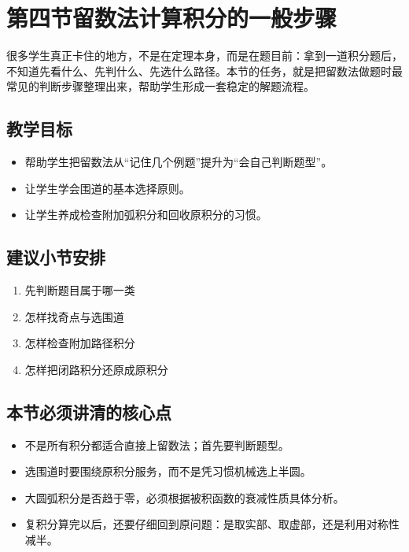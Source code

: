 \section{第四节\quad 留数法计算积分的一般步骤}

\begin{wulibj}[本节要解决的问题]
很多学生真正卡住的地方，不是在定理本身，而是在题目前：拿到一道积分题后，不知道先看什么、先判什么、先选什么路径。本节的任务，就是把留数法做题时最常见的判断步骤整理出来，帮助学生形成一套稳定的解题流程。
\end{wulibj}

\subsection*{教学目标}
\begin{itemize}
    \item 帮助学生把留数法从``记住几个例题''提升为``会自己判断题型''。
    \item 让学生学会围道的基本选择原则。
    \item 让学生养成检查附加弧积分和回收原积分的习惯。
\end{itemize}

\subsection*{建议小节安排}
\begin{enumerate}
    \item 先判断题目属于哪一类
    \item 怎样找奇点与选围道
    \item 怎样检查附加路径积分
    \item 怎样把闭路积分还原成原积分
\end{enumerate}

\subsection*{本节必须讲清的核心点}
\begin{itemize}
    \item 不是所有积分都适合直接上留数法；首先要判断题型。
    \item 选围道时要围绕原积分服务，而不是凭习惯机械选上半圆。
    \item 大圆弧积分是否趋于零，必须根据被积函数的衰减性质具体分析。
    \item 复积分算完以后，还要仔细回到原问题：是取实部、取虚部，还是利用对称性减半。
\end{itemize}

